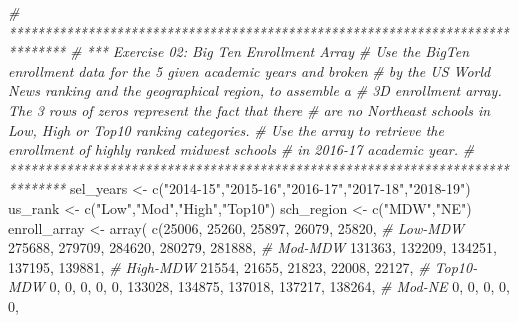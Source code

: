 \documentclass[
]{article}
\newenvironment{Shaded}{\begin{snugshade}}{\end{snugshade}}
\newcommand{\CommentTok}[1]{\textcolor[rgb]{0.56,0.35,0.01}{\textit{#1}}}
\newcommand{\DecValTok}[1]{\textcolor[rgb]{0.00,0.00,0.81}{#1}}
\newcommand{\FunctionTok}[1]{\textcolor[rgb]{0.00,0.00,0.00}{#1}}
\newcommand{\NormalTok}[1]{#1}
\newcommand{\OtherTok}[1]{\textcolor[rgb]{0.56,0.35,0.01}{#1}}
\newcommand{\StringTok}[1]{\textcolor[rgb]{0.31,0.60,0.02}{#1}}
\begin{document}
\begin{Shaded}
\begin{Highlighting}[]
\CommentTok{\# ******************************************************************************}
\CommentTok{\# *** Exercise 02: Big Ten Enrollment Array}
\CommentTok{\# Use the BigTen enrollment data for the 5 given academic years and broken }
\CommentTok{\# by the US World News ranking and the geographical region, to assemble a}
\CommentTok{\# 3D enrollment array. The 3 rows of zero\textquotesingle{}s represent the fact that there}
\CommentTok{\# are no Northeast schools in Low, High or Top10 ranking categories.}
\CommentTok{\# Use the array to retrieve the enrollment of highly ranked midwest schools}
\CommentTok{\# in 2016{-}17 academic year.}
\CommentTok{\# ******************************************************************************}
\NormalTok{sel\_years }\OtherTok{\textless{}{-}} \FunctionTok{c}\NormalTok{(}\StringTok{"2014{-}15"}\NormalTok{,}\StringTok{"2015{-}16"}\NormalTok{,}\StringTok{"2016{-}17"}\NormalTok{,}\StringTok{"2017{-}18"}\NormalTok{,}\StringTok{"2018{-}19"}\NormalTok{)}
\NormalTok{us\_rank }\OtherTok{\textless{}{-}} \FunctionTok{c}\NormalTok{(}\StringTok{"Low"}\NormalTok{,}\StringTok{"Mod"}\NormalTok{,}\StringTok{"High"}\NormalTok{,}\StringTok{"Top10"}\NormalTok{)}
\NormalTok{sch\_region }\OtherTok{\textless{}{-}} \FunctionTok{c}\NormalTok{(}\StringTok{"MDW"}\NormalTok{,}\StringTok{"NE"}\NormalTok{)}
\NormalTok{enroll\_array }\OtherTok{\textless{}{-}} \FunctionTok{array}\NormalTok{(}
  \FunctionTok{c}\NormalTok{(}\DecValTok{25006}\NormalTok{,  }\DecValTok{25260}\NormalTok{,  }\DecValTok{25897}\NormalTok{,  }\DecValTok{26079}\NormalTok{,  }\DecValTok{25820}\NormalTok{,     }\CommentTok{\# Low{-}MDW}
    \DecValTok{275688}\NormalTok{, }\DecValTok{279709}\NormalTok{, }\DecValTok{284620}\NormalTok{, }\DecValTok{280279}\NormalTok{, }\DecValTok{281888}\NormalTok{,    }\CommentTok{\# Mod{-}MDW}
    \DecValTok{131363}\NormalTok{, }\DecValTok{132209}\NormalTok{, }\DecValTok{134251}\NormalTok{, }\DecValTok{137195}\NormalTok{, }\DecValTok{139881}\NormalTok{,    }\CommentTok{\# High{-}MDW}
    \DecValTok{21554}\NormalTok{,  }\DecValTok{21655}\NormalTok{,  }\DecValTok{21823}\NormalTok{,  }\DecValTok{22008}\NormalTok{,  }\DecValTok{22127}\NormalTok{,     }\CommentTok{\# Top10{-}MDW}
    \DecValTok{0}\NormalTok{, }\DecValTok{0}\NormalTok{,   }\DecValTok{0}\NormalTok{, }\DecValTok{0}\NormalTok{,   }\DecValTok{0}\NormalTok{,}
    \DecValTok{133028}\NormalTok{, }\DecValTok{134875}\NormalTok{, }\DecValTok{137018}\NormalTok{, }\DecValTok{137217}\NormalTok{, }\DecValTok{138264}\NormalTok{,    }\CommentTok{\# Mod{-}NE}
    \DecValTok{0}\NormalTok{, }\DecValTok{0}\NormalTok{,   }\DecValTok{0}\NormalTok{, }\DecValTok{0}\NormalTok{,   }\DecValTok{0}\NormalTok{,}

\end{Highlighting}
\end{Shaded}
\end{document}
